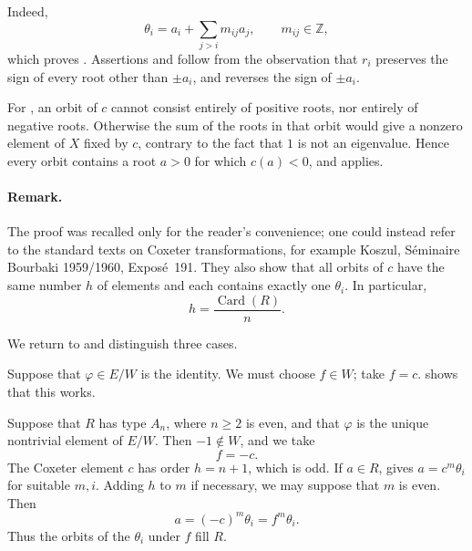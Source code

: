 Indeed,
\[
  \theta_i=a_i+\sum_{j>i}m_{ij}a_j,\qquad m_{ij}\in\mathbb Z,
\]
which proves \textup{}. Assertions \textup{} and
\textup{} follow from the observation that \(r_i\) preserves
the sign of every root other than \(\pm a_i\), and reverses the
sign of \(\pm a_i\).

For \textup{}, an orbit of \(c\) cannot consist entirely of
positive roots, nor entirely of negative roots. Otherwise the
sum of the roots in that orbit would give a nonzero element of
\(X\) fixed by \(c\), contrary to the fact that \(1\) is not an
eigenvalue. Hence every orbit contains a root \(a>0\) for which
\(c(a)<0\), and \textup{} applies.

\paragraph{\textbf{Remark.}}
The proof was recalled only for the reader's convenience; one
could instead refer to the standard texts on Coxeter
transformations, for example Koszul, Séminaire Bourbaki
1959/1960, Exposé~191. They also show that all orbits of \(c\)
have the same number \(h\) of elements and each contains exactly
one \(\theta_i\). In particular,
\[
  h=\frac{\operatorname{Card}(R)}{n}.
\]

We return to  and distinguish three cases.

\medskip
\noindent\textup{}
Suppose that \(\varphi\in E/W\) is the identity. We must choose
\(f\in W\); take \(f=c\).  shows that this works.

\medskip
\noindent\textup{}
Suppose that \(R\) has type \(A_n\), where \(n\ge2\) is even, and
that \(\varphi\) is the unique nontrivial element of \(E/W\).
Then \(-1\notin W\), and we take
\[
  f=-c.
\]
The Coxeter element \(c\) has order \(h=n+1\), which is odd. If
\(a\in R\),  gives \(a=c^m\theta_i\) for suitable \(m,i\).
Adding \(h\) to \(m\) if necessary, we may suppose that \(m\) is
even. Then
\[
  a=(-c)^m\theta_i=f^m\theta_i.
\]
Thus the orbits of the \(\theta_i\) under \(f\) fill \(R\).


